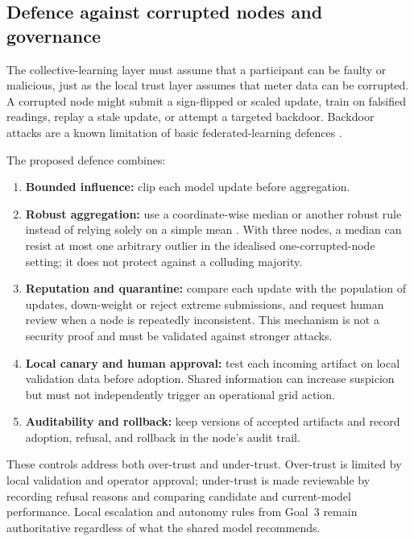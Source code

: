 \subsection{Defence against corrupted nodes and governance}
The collective-learning layer must assume that a participant can be faulty or malicious, just as the local trust layer assumes that meter data can be corrupted. A corrupted node might submit a sign-flipped or scaled update, train on falsified readings, replay a stale update, or attempt a targeted backdoor. Backdoor attacks are a known limitation of basic federated-learning defences \cite{bagdasaryan2020}.

The proposed defence combines:
\begin{enumerate}
  \item \textbf{Bounded influence:} clip each model update before aggregation.
  \item \textbf{Robust aggregation:} use a coordinate-wise median or another robust rule instead of relying solely on a simple mean \cite{yin2018}. With three nodes, a median can resist at most one arbitrary outlier in the idealised one-corrupted-node setting; it does not protect against a colluding majority.
  \item \textbf{Reputation and quarantine:} compare each update with the population of updates, down-weight or reject extreme submissions, and request human review when a node is repeatedly inconsistent. This mechanism is not a security proof and must be validated against stronger attacks.
  \item \textbf{Local canary and human approval:} test each incoming artifact on local validation data before adoption. Shared information can increase suspicion but must not independently trigger an operational grid action.
  \item \textbf{Auditability and rollback:} keep versions of accepted artifacts and record adoption, refusal, and rollback in the node's audit trail.
\end{enumerate}

These controls address both over-trust and under-trust. Over-trust is limited by local validation and operator approval; under-trust is made reviewable by recording refusal reasons and comparing candidate and current-model performance. Local escalation and autonomy rules from Goal~3 remain authoritative regardless of what the shared model recommends.

